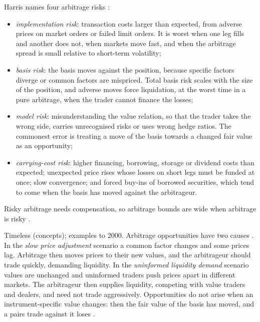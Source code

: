 \begin{qfresult}\label{res:arbitrage-risks}
 Harris names four arbitrage risks \citep[chap.~``Arbitrageurs'', sec.~17.4, pp.~363--373]{alpha-harris}:
\begin{itemize}
\item \emph{implementation risk}: transaction costs larger than expected, from adverse prices on market orders or failed limit orders. It is worst when one leg fills and another does not, when markets move fast, and when the arbitrage spread is small relative to short-term volatility;
\item \emph{basis risk}: the basis moves against the position, because specific factors diverge or common factors are mispriced. Total basis risk scales with the size of the position, and adverse moves force liquidation, at the worst time in a pure arbitrage, when the trader cannot finance the losses;
\item \emph{model risk}: misunderstanding the value relation, so that the trader takes the wrong side, carries unrecognised risks or uses wrong hedge ratios. The commonest error is treating a move of the basis towards a changed fair value as an opportunity;
\item \emph{carrying-cost risk}: higher financing, borrowing, storage or dividend costs than expected; unexpected price rises whose losses on short legs must be funded at once; slow convergence; and forced buy-ins of borrowed securities, which tend to come when the basis has moved against the arbitrageur.
\end{itemize}
Risky arbitrage needs compensation, so arbitrage bounds are wide when arbitrage is risky \citep[same sec., p.~364]{alpha-harris}.

 Timeless (concepts); examples to 2000. Arbitrage opportunities have two causes \citep[same chap., sec.~17.5, pp.~373--375]{alpha-harris}. In the \emph{slow price adjustment} scenario a common factor changes and some prices lag. Arbitrage then moves prices to their new values, and the arbitrageur should trade quickly, demanding liquidity. In the \emph{uninformed liquidity demand} scenario values are unchanged and uninformed traders push prices apart in different markets. The arbitrageur then supplies liquidity, competing with value traders and dealers, and need not trade aggressively. Opportunities do not arise when an instrument-specific value changes: then the fair value of the basis has moved, and a pairs trade against it loses \citep[same chap., pp.~358--360 and~368]{alpha-harris}.


\end{qfresult}
